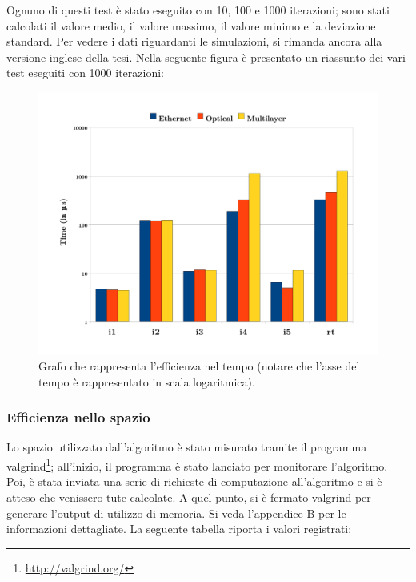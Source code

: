 \documentclass[10pt,a4paper]{report}
\begin{document}
Ognuno di questi test è stato eseguito con 10, 100 e 1000 iterazioni;
sono stati calcolati il valore medio, il valore massimo, il valore
minimo e la deviazione standard. Per vedere i dati riguardanti le
simulazioni, si rimanda ancora alla versione inglese della tesi. Nella
seguente figura è presentato un riassunto dei vari test eseguiti con
1000 iterazioni:

\begin{figure}[!htbp]
  \begin{center}
    \includegraphics[width=1\textwidth]{img/time_graph}
    \caption[]{Grafo che rappresenta l'efficienza nel tempo (notare
      che l'asse del tempo è rappresentato in scala logaritmica).}
  \end{center}
\end{figure}

\subsubsection*{Efficienza nello spazio}

Lo spazio utilizzato dall'algoritmo è stato misurato tramite il
programma valgrind\footnote{\url{http://valgrind.org/}}; all'inizio, il programma
è stato lanciato per monitorare l'algoritmo. Poi, è stata inviata una
serie di richieste di computazione all'algoritmo e si è atteso che
venissero tute calcolate. A quel punto, si è fermato valgrind per
generare l'output di utilizzo di memoria. Si veda l'appendice B per le
informazioni dettagliate. La seguente tabella riporta i valori
registrati:
\end{document}
